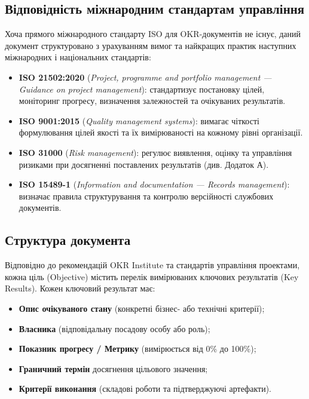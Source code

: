 \documentclass{article}
\begin{document}
\subsection{Відповідність міжнародним стандартам управління}
Хоча прямого міжнародного стандарту ISO для OKR-документів не існує, даний документ структуровано з урахуванням вимог та найкращих практик наступних міжнародних і національних стандартів:
\begin{itemize}
    \item \textbf{ISO 21502:2020} (\emph{Project, programme and portfolio management --- Guidance on project management}): стандартизує постановку цілей, моніторинг прогресу, визначення залежностей та очікуваних результатів.
    \item \textbf{ISO 9001:2015} (\emph{Quality management systems}): вимагає чіткості формулювання цілей якості та їх вимірюваності на кожному рівні організації.
    \item \textbf{ISO 31000} (\emph{Risk management}): регулює виявлення, оцінку та управління ризиками при досягненні поставлених результатів (див. Додаток А).
    \item \textbf{ISO 15489-1} (\emph{Information and documentation --- Records management}): визначає правила структурування та контролю версійності службових документів.
\end{itemize}

\subsection{Структура документа}
Відповідно до рекомендацій OKR Institute та стандартів управління проектами, кожна ціль (Objective) містить перелік вимірюваних ключових результатів (Key Results). Кожен ключовий результат має:
\begin{itemize}
    \item \textbf{Опис очікуваного стану} (конкретні бізнес- або технічні критерії);
    \item \textbf{Власника} (відповідальну посадову особу або роль);
    \item \textbf{Показник прогресу / Метрику} (вимірюється від 0\% до 100\%);
    \item \textbf{Граничний термін} досягнення цільового значення;
    \item \textbf{Критерії виконання} (складові роботи та підтверджуючі артефакти).
\end{itemize}

\newpage
\end{document}

